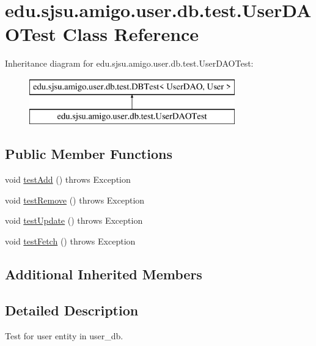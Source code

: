 \hypertarget{classedu_1_1sjsu_1_1amigo_1_1user_1_1db_1_1test_1_1_user_d_a_o_test}{}\section{edu.\+sjsu.\+amigo.\+user.\+db.\+test.\+User\+D\+A\+O\+Test Class Reference}
\label{classedu_1_1sjsu_1_1amigo_1_1user_1_1db_1_1test_1_1_user_d_a_o_test}
Inheritance diagram for edu.\+sjsu.\+amigo.\+user.\+db.\+test.\+User\+D\+A\+O\+Test\+:\begin{figure}[H]
\begin{center}
\leavevmode
\includegraphics[height=2.000000cm]{classedu_1_1sjsu_1_1amigo_1_1user_1_1db_1_1test_1_1_user_d_a_o_test}
\end{center}
\end{figure}
\subsection*{Public Member Functions}
\begin{DoxyCompactItemize}
\item 
void \hyperlink{classedu_1_1sjsu_1_1amigo_1_1user_1_1db_1_1test_1_1_user_d_a_o_test_af725294b50beae48dc26450c1dfc9ea8}{test\+Add} ()  throws Exception 
\item 
void \hyperlink{classedu_1_1sjsu_1_1amigo_1_1user_1_1db_1_1test_1_1_user_d_a_o_test_a0e178e2bb5b301bf56ad74a604c58908}{test\+Remove} ()  throws Exception 
\item 
void \hyperlink{classedu_1_1sjsu_1_1amigo_1_1user_1_1db_1_1test_1_1_user_d_a_o_test_a8bd1ecf63b75dfb919536d80f18a938e}{test\+Update} ()  throws Exception 
\item 
void \hyperlink{classedu_1_1sjsu_1_1amigo_1_1user_1_1db_1_1test_1_1_user_d_a_o_test_acde923335c8aef661797cf18cfebd105}{test\+Fetch} ()  throws Exception 
\end{DoxyCompactItemize}
\subsection*{Additional Inherited Members}


\subsection{Detailed Description}
Test for user entity in user\+\_\+db.

